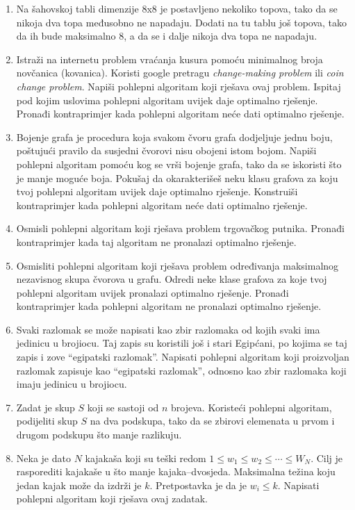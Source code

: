 \documentclass[a4paper, utf8, 11pt, colorlinks]{book}
\theoremstyle{definition}
\begin{document}
\begin{enumerate}
	\item Na šahovskoj tabli dimenzije 8x8 je postavljeno nekoliko topova, tako da se nikoja dva topa međusobno ne napadaju. Dodati na tu tablu još topova, tako da ih bude maksimalno 8, a da se i dalje nikoja dva topa ne napadaju.
	\item Istraži na internetu problem vraćanja kusura pomoću minimalnog broja novčanica (kovanica). Koristi google pretragu \textit{change-making problem} ili \textit{coin change problem}. Napiši pohlepni algoritam koji rješava ovaj problem. Ispitaj pod kojim uslovima pohlepni algoritam uvijek daje optimalno rješenje. Pronađi kontraprimjer kada pohlepni algoritam neće dati optimalno rješenje.
	\item Bojenje grafa je procedura koja svakom čvoru grafa dodjeljuje jednu boju, poštujući pravilo da susjedni čvorovi nisu obojeni istom bojom. Napiši pohlepni algoritam pomoću kog se vrši bojenje grafa, tako da se iskoristi što je manje moguće boja. Pokušaj da okarakterišeš neku klasu grafova za koju tvoj pohlepni algoritam uvijek daje optimalno rješenje. Konstruiši kontraprimjer kada pohlepni algoritam neće dati optimalno rješenje.
	
	\item Osmisli pohlepni algoritam koji rješava problem trgovačkog putnika. Pronađi kontraprimjer kada taj algoritam ne pronalazi optimalno rješenje.
	
	\item Osmisliti pohlepni algoritam koji rješava problem određivanja maksimalnog nezavisnog skupa čvorova u grafu. Odredi neke klase grafova za koje tvoj pohlepni algoritam uvijek pronalazi optimalno rješenje. Pronađi kontraprimjer kada pohlepni algoritam ne pronalazi optimalno rješenje.
	
	\item Svaki razlomak se može napisati kao zbir razlomaka od kojih svaki ima jedinicu u brojiocu. Taj zapis su koristili još i stari Egipćani, po kojima se taj zapis i zove ``egipatski razlomak''. 
	Napisati pohlepni algoritam koji proizvoljan razlomak zapisuje kao ``egipatski razlomak'', odnosno kao zbir razlomaka koji imaju jedinicu u brojiocu.
	
	\item Zadat je skup $S$ koji se sastoji od $n$ brojeva. Koristeći pohlepni algoritam, podijeliti skup $S$ na dva podskupa, tako da se zbirovi elemenata u prvom i drugom podskupu što manje razlikuju.
	
	\item Neka je dato $N$ kajakaša koji su teški redom $1\leqslant w_1\leqslant w_2\leqslant \cdots \leqslant W_N$. Cilj je rasporediti kajakaše u što manje kajaka--dvosjeda. Maksimalna težina koju jedan kajak može da izdrži je $k$. Pretpostavka je da je $w_i\leqslant k$. Napisati pohlepni algoritam koji rješava ovaj zadatak.
	

\end{enumerate}
\end{document}
